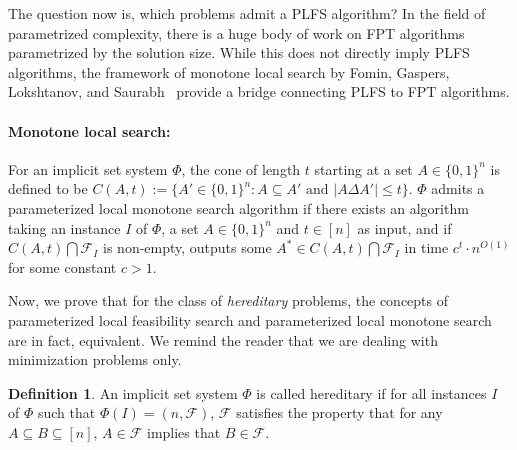 \documentclass[11pt, letterpaper]{article}
\theoremstyle{definition}
\newtheorem{definition}{Definition}
\newcommand{\Q}[1]{\{0,1\}^{#1}}
\newcommand{\calf}{\mathcal{F}}
\begin{document}
The question now is, which problems admit a PLFS algorithm? In the field of parametrized complexity, there is a huge body of work on FPT algorithms parametrized by the solution size. While this does not directly imply PLFS algorithms, the framework of monotone local search by Fomin, Gaspers, Lokshtanov, and Saurabh~\cite{ConicSearch} provide a bridge connecting PLFS to FPT algorithms. 

\paragraph{Monotone local search:} For an implicit set system $\Phi$, the cone of length $t$ starting at a set $A \in \Q{n}$ is defined to be $C(A,t):= \{A' \in \Q{n}: A \subseteq A' \text{  and } |A \Delta A'| \leq t\}$. $\Phi$ admits a parameterized local monotone search algorithm if there exists an algorithm taking an instance $I$ of $\Phi$, a set $A \in \Q{n}$ and $t \in [n]$ as input, and if $C(A,t) \bigcap \calf_I$ is non-empty, outputs some $A^* \in C(A,t) \bigcap \calf_I$ in time $c^t\cdot n^{O(1)}$ for some constant $c>1$. 

Now, we prove that for the class of \emph{hereditary} problems, the concepts of parameterized local feasibility search and parameterized local monotone search are in fact, equivalent. We remind the reader that we are dealing with minimization problems only. 
\begin{definition}
    An implicit set system $\Phi$ is called hereditary if for all instances $I$ of $\Phi$ such that $\Phi(I)=\left(n ,\calf\right)$, $\calf$ satisfies the property that for any $A \subseteq B \subseteq [n]$, $A \in \mathcal{F}$ implies that $B \in \mathcal{F}$.
\end{definition}
\end{document}
